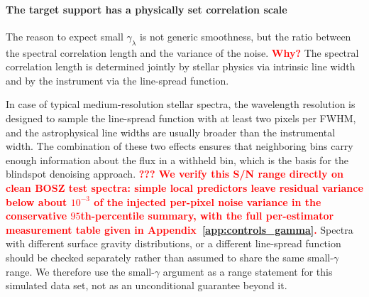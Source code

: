 \documentclass[twocolumn]{aastex7}
\newcommand{\ld}[1]{\textcolor{red}{\textbf{#1}}}
\begin{document}
\paragraph{The target support has a physically set correlation scale}
The reason to expect small $\gamma_\lambda$ is not generic smoothness, but the ratio between the spectral correlation length and the variance of the noise. \ld{Why?} The spectral correlation length is determined jointly by stellar physics via intrinsic line width and by the instrument via the line-spread function.

In case of typical medium-resolution stellar spectra, the wavelength resolution is designed to sample the line-spread function with at least two pixels per FWHM, and the astrophysical line widths are usually broader than the instrumental width. The combination of these two effects ensures that neighboring bins carry enough information about the flux in a withheld bin, which is the basis for the blindspot denoising approach.
\ld{??? We verify this S/N range directly on clean BOSZ test spectra: simple local predictors leave residual variance below about $10^{-3}$ of the injected per-pixel noise variance in the conservative $95$th-percentile summary, with the full per-estimator measurement table given in Appendix~\ref{app:controls_gamma}.}
Spectra with different surface gravity distributions, or a different line-spread function should be checked separately rather than assumed to share the same small-$\gamma$ range. We therefore use the small-$\gamma$ argument as a range statement for this simulated data set, not as an unconditional guarantee beyond it.
\end{document}
